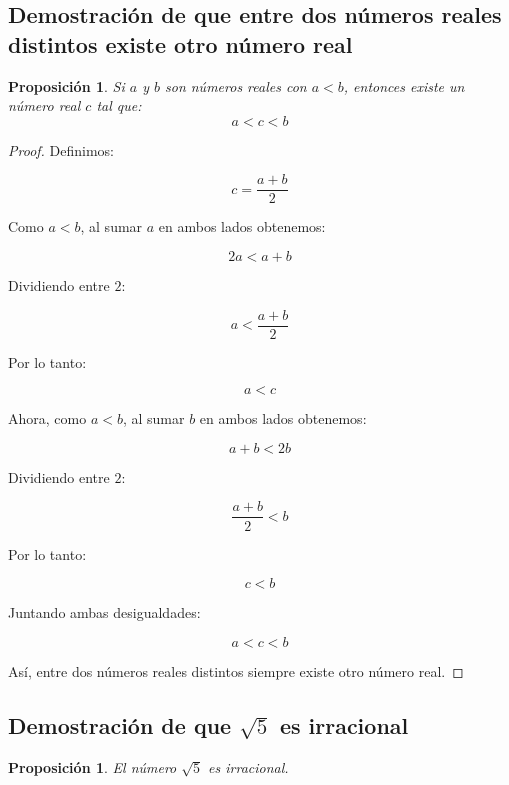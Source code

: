 \documentclass[12pt,final]{report}
\theoremstyle{plain}
\newtheorem{proposition}[theorem]{Proposición}
\theoremstyle{definition}
\begin{document}
\newpage

\subsection{Demostración de que entre dos números reales distintos existe otro número real}

\begin{proposition}
Si $a$ y $b$ son números reales con $a<b$, entonces existe un número real $c$ tal que:
\[
a<c<b
\]
\end{proposition}

\begin{proof}

Definimos:

\[
c=\frac{a+b}{2}
\]

Como $a<b$, al sumar $a$ en ambos lados obtenemos:

\[
2a<a+b
\]

Dividiendo entre $2$:

\[
a<\frac{a+b}{2}
\]

Por lo tanto:

\[
a<c
\]

Ahora, como $a<b$, al sumar $b$ en ambos lados obtenemos:

\[
a+b<2b
\]

Dividiendo entre $2$:

\[
\frac{a+b}{2}<b
\]

Por lo tanto:

\[
c<b
\]

Juntando ambas desigualdades:

\[
a<c<b
\]

Así, entre dos números reales distintos siempre existe otro número real.

\end{proof}

\newpage

\subsection{Demostración de que $\sqrt{5}$ es irracional}

\begin{proposition}
El número $\sqrt{5}$ es irracional.
\end{proposition}
\end{document}
